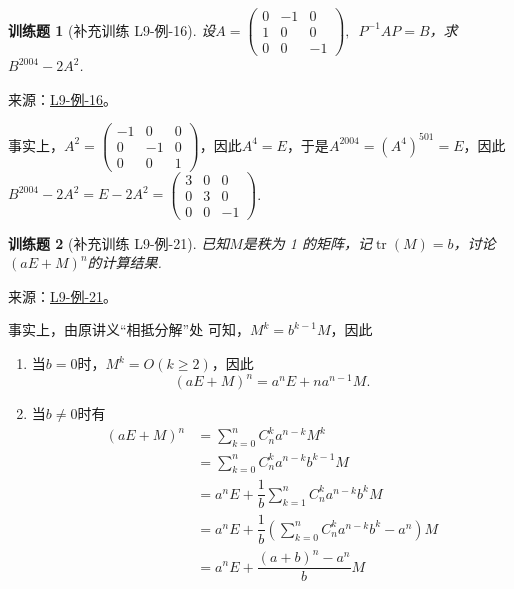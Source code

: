 \documentclass[12pt,fontset=fandol]{ctexart}
\newtheorem{exercise}{训练题}[section]
\begin{document}
\begin{exercise}[补充训练 L9-例-16]\label{prob:L9-例-16}
设$A=\begin{pmatrix}0 & -1 & 0 \\ 1 & 0 & 0 \\ 0 & 0 & -1 \end{pmatrix},\enspace P^{-1}AP=B$，求$B^{2004}-2A^2$.
\end{exercise}
\noindent 来源：\href{https://github.com/yhwu-is/Linear-Algebra-Left-Undone/blob/new/%E8%AE%B2%E4%B9%89/%E4%B8%93%E9%A2%98/9%20%E7%9F%A9%E9%98%B5%E8%BF%90%E7%AE%97%E8%BF%9B%E9%98%B6.tex}{L9-例-16}。
\begin{solve}
事实上，$A^2=\begin{pmatrix}
                      -1 & 0 & 0 \\ 0 & -1 & 0 \\ 0 & 0 & 1
                  \end{pmatrix}$，因此$A^4=E$，于是$A^{2004}=(A^4)^{501}=E$，因此$B^{2004}-2A^2=E-2A^2=\begin{pmatrix}
                      3 & 0 & 0 \\ 0 & 3  & 0 \\ 0 & 0 & -1
                  \end{pmatrix}$.
\end{solve}

\begin{exercise}[补充训练 L9-例-21]\label{prob:L9-例-21}
已知$M$是秩为 1 的矩阵，记$\operatorname{tr}(M)=b$，讨论$(aE+M)^n$的计算结果.
\end{exercise}
\noindent 来源：\href{https://github.com/yhwu-is/Linear-Algebra-Left-Undone/blob/new/%E8%AE%B2%E4%B9%89/%E4%B8%93%E9%A2%98/9%20%E7%9F%A9%E9%98%B5%E8%BF%90%E7%AE%97%E8%BF%9B%E9%98%B6.tex}{L9-例-21}。
\begin{solve}
事实上，由原讲义“相抵分解”处 可知，$M^k=b^{k-1}M$，因此
              \begin{enumerate}
                  \item 当$b=0$时，$M^k=O(k\geqslant 2)$，因此
                        \[(aE+M)^n=a^nE+na^{n-1}M.\]

                  \item 当$b\neq 0$时有
                        \begin{align*}
                            (aE+M)^n & =\sum\limits_{k=0}^nC_n^ka^{n-k}M^k                                    \\
                                     & =\sum\limits_{k=0}^nC_n^ka^{n-k}b^{k-1}M                               \\
                                     & =a^nE+\dfrac{1}{b}\sum\limits_{k=1}^nC_n^ka^{n-k}b^kM                  \\
                                     & =a^nE+\dfrac{1}{b}\left(\sum\limits_{k=0}^nC_n^ka^{n-k}b^k-a^n\right)M \\
                                     & =a^nE+\dfrac{(a+b)^n-a^n}{b}M
                        \end{align*}
              \end{enumerate}
\end{solve}
\end{document}
